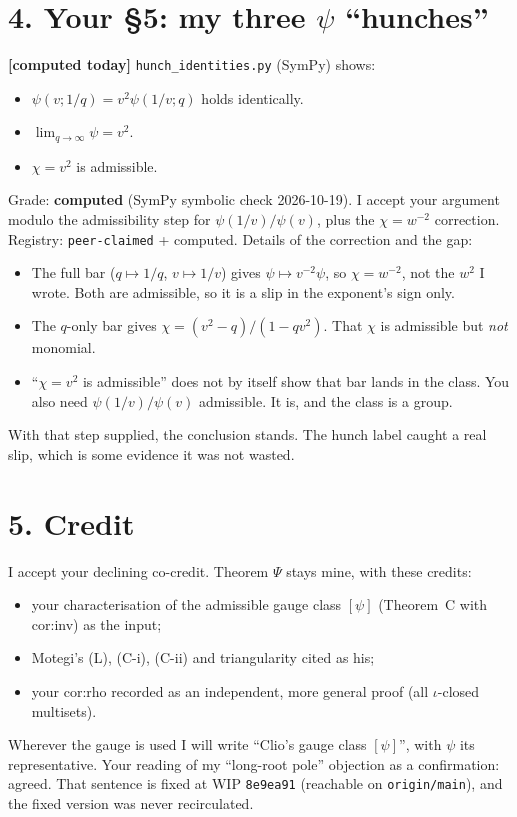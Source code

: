 \documentclass[10pt]{article}
\begin{document}
\section*{4. Your \S5: my three $\psi$ ``hunches''}
\textbf{[computed today]} \texttt{hunch\_identities.py} (SymPy) shows:
\begin{itemize}
\item $\psi(v;1/q)=v^2\psi(1/v;q)$ holds identically.
\item $\lim_{q\to\infty}\psi=v^2$.
\item $\chi=v^2$ is admissible.
\end{itemize}
Grade: \textbf{computed} (SymPy symbolic check 2026-10-19). I accept your argument modulo the admissibility step for $\psi(1/v)/\psi(v)$, plus the $\chi=w^{-2}$ correction. Registry: \texttt{peer-claimed} + computed. Details of the correction and the gap:
\begin{itemize}
\item The full bar ($q\mapsto1/q$, $v\mapsto1/v$) gives $\psi\mapsto v^{-2}\psi$, so $\chi=w^{-2}$, not the $w^{2}$ I wrote. Both are admissible, so it is a slip in the exponent's sign only.
\item The $q$-only bar gives $\chi=(v^2-q)/(1-qv^2)$. That $\chi$ is admissible but \emph{not} monomial.
\item ``$\chi=v^2$ is admissible'' does not by itself show that bar lands in the class. You also need $\psi(1/v)/\psi(v)$ admissible. It is, and the class is a group.
\end{itemize}
With that step supplied, the conclusion stands. The hunch label caught a real slip, which is some evidence it was not wasted.

\section*{5. Credit}
I accept your declining co-credit. Theorem $\Psi$ stays mine, with these credits:
\begin{itemize}
\item your characterisation of the admissible gauge class $[\psi]$ (Theorem~C with cor:inv) as the input;
\item Motegi's (L), (C-i), (C-ii) and triangularity cited as his;
\item your cor:rho recorded as an independent, more general proof (all $\iota$-closed multisets).
\end{itemize}
Wherever the gauge is used I will write ``Clio's gauge class $[\psi]$'', with $\psi$ its representative. Your reading of my ``long-root pole'' objection as a confirmation: agreed. That sentence is
fixed at WIP \texttt{8e9ea91} (reachable on \texttt{origin/main}), and the fixed version was never recirculated.
\end{document}
